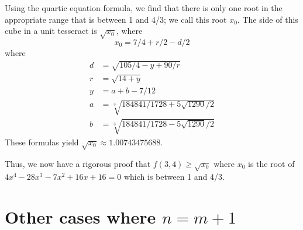 Using the quartic equation formula, we find that there is only one root in the
appropriate range that is between 1 and 4/3; we call this root $x_0$.  The
side of this cube in a unit tesseract is $\sqrt{x_0}$, where
\begin{equation*}
x_0 = 7/4 + r/2 - d/2
\end{equation*}
where
\begin{align*}
d & = \sqrt{105/4 - y + 90/r}                 \\
r & = \sqrt{14+y}                             \\
y & = a + b - 7/12                            \\
a & = \sqrt[3]{184841/1728 + 5 \sqrt{1290}/2} \\
b & = \sqrt[3]{184841/1728 - 5 \sqrt{1290}/2}
\end{align*}
These formulas yield $\sqrt{x_0} \approx 1.00743475688$.

Thus, we now have a rigorous proof that $f(3,4) \geq \sqrt{x_0}$ where $x_0$
is the root of $4 x^4 - 28 x^3 - 7 x^2 + 16 x + 16 = 0$ which is between 1 and
4/3.

\section*{Other cases where $n = m+1$}

